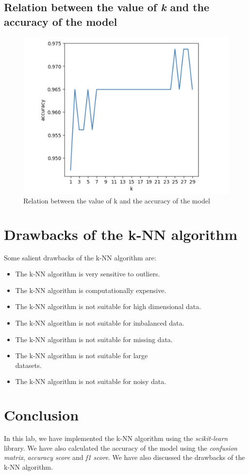 \subsection{Relation between the value of \textit{k} and the accuracy of the model}
\begin{figure}[h]
    \centering
    \includegraphics[width=12cm]{ch/figures/k-vs-score.png}
    \caption{Relation between the value of k and the accuracy of the model}
    \label{fig:k-acc}
\end{figure}
\newpage
\section{Drawbacks of the k-NN algorithm}
Some salient drawbacks of the k-NN algorithm are:
\begin{itemize}
    \item The k-NN algorithm is very sensitive to outliers.
    \item The k-NN algorithm is computationally expensive.
    \item The k-NN algorithm is not suitable for high dimensional data.
    \item The k-NN algorithm is not suitable for imbalanced data.
    \item The k-NN algorithm is not suitable for missing data.
    \item The k-NN algorithm is not suitable for large \\datasets.
    \item The k-NN algorithm is not suitable for noisy data.
\end{itemize}

\section{Conclusion}
In this lab, we have implemented the k-NN algorithm using the \textit{scikit-learn} library. We have also calculated the accuracy of the model using the \textit{confusion matrix}, \textit{accuracy score} and \textit{f1 score}. We have also discussed the drawbacks of the k-NN algorithm.